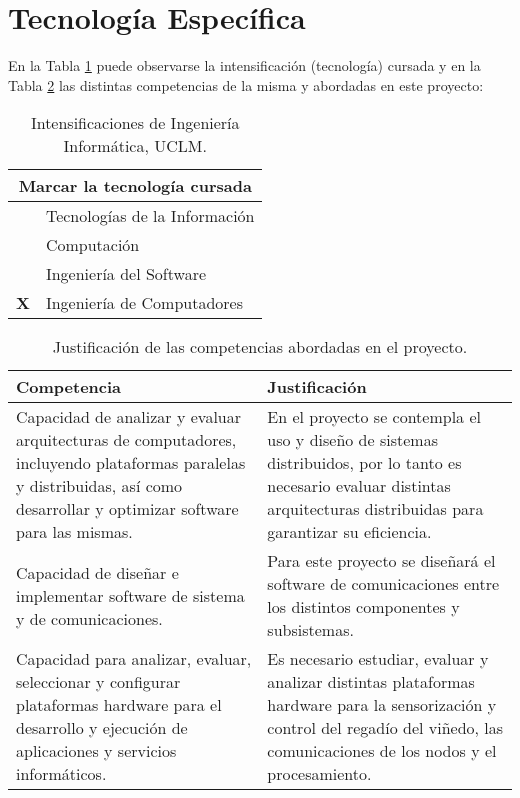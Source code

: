 
\newpage
\section{Tecnología Específica}
\label{sec:technology}

En la Tabla \ref{tab:intensificacion} puede observarse la intensificación (tecnología) cursada y en la Tabla \ref{tab:competencias} las distintas competencias de la misma y abordadas en este proyecto:

\begin{table}[h]
    \centering
    \def\tablename{Tabla}
    \caption{Intensificaciones de Ingeniería Informática, UCLM.}
    \vspace{0.5em}
    \begin{tabular}{ | c || l | }
        \hline
        \multicolumn{2}{|c|}{\bfseries Marcar la tecnología cursada}\\ \hline\hline
         & Tecnologías de la Información \\ \hline
         & Computación \\ \hline
         & Ingeniería del Software \\ \hline
         {\bfseries X} & Ingeniería de Computadores \\ \hline
    \end{tabular}
    \label{tab:intensificacion}
\end{table}

\begin{table}[h]
    \centering
    \def\tablename{Tabla}
    \caption{Justificación de las competencias abordadas en el proyecto.}
    \vspace{0.5em}
    \begin{tabular}{ | p{8cm} | p{8cm} | }
        \hline
        {\bfseries Competencia} & {\bfseries Justificación} \\ \hline\hline
        Capacidad de analizar y evaluar arquitecturas de computadores, incluyendo plataformas paralelas y distribuidas, así como desarrollar y optimizar software para las mismas.
        &
        En el proyecto se contempla el uso y diseño de sistemas distribuidos, por lo tanto es necesario evaluar distintas arquitecturas distribuidas para garantizar su eficiencia.
        \\ \hline
        Capacidad de diseñar e implementar software de sistema y de comunicaciones.
        &
        Para este proyecto se diseñará el software de comunicaciones entre los distintos componentes y subsistemas.
        \\ \hline
        Capacidad para analizar, evaluar, seleccionar y configurar plataformas hardware para el desarrollo y ejecución de aplicaciones y servicios informáticos.
        &
        Es necesario estudiar, evaluar y analizar distintas plataformas hardware para la sensorización y control del regadío del viñedo, las comunicaciones de los nodos y el procesamiento.
        \\ \hline
    \end{tabular}
    \label{tab:competencias}
\end{table}